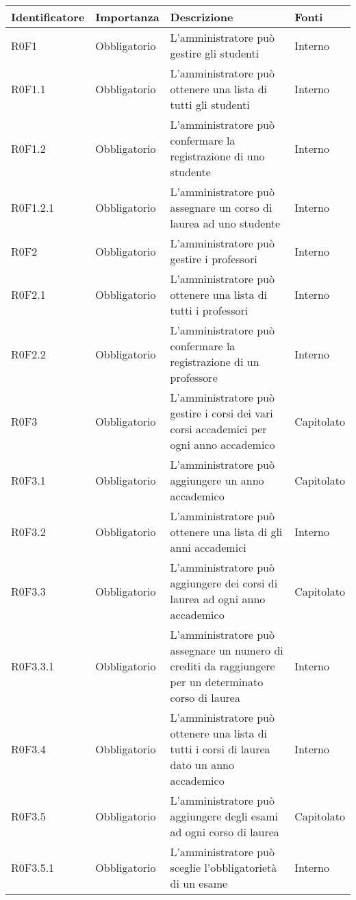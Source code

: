 \documentclass[AnalisiDeiRequisiti.tex]{subfiles}
\begin{document}
\label{table:Tabella requisiti funzionali}
\begin{longtable}[H]{|p{2.5cm}|p{2.5cm}|p{5cm}|p{2cm}|}
	\hline
	\rowcolor[HTML]{38FFF8} 
	\textbf{Identificatore} & \textbf{Importanza} & \textbf{Descrizione} & \textbf{Fonti} \\ \hline
	\endhead
	R0F1 & Obbligatorio & L'amministratore può gestire gli studenti & Interno \\ \hline
	R0F1.1 & Obbligatorio & L'amministratore può ottenere una lista di tutti gli studenti & Interno \\ \hline
	R0F1.2 & Obbligatorio & L'amministratore può confermare la registrazione di uno studente & Interno \\ \hline
	R0F1.2.1 & Obbligatorio & L'amministratore può assegnare un corso di laurea ad uno studente & Interno \\ \hline
	R0F2 & Obbligatorio & L'amministratore può gestire i professori & Interno \\ \hline
	R0F2.1 & Obbligatorio & L'amministratore può ottenere una lista di tutti i professori & Interno \\ \hline
	R0F2.2 & Obbligatorio & L'amministratore può confermare la registrazione di un professore & Interno \\ \hline
	R0F3 & Obbligatorio & L'amministratore può gestire i corsi dei vari corsi accademici per ogni anno accademico & Capitolato \\ \hline %
	R0F3.1 & Obbligatorio & L'amministratore può aggiungere un anno accademico & Capitolato \\ \hline
	R0F3.2 & Obbligatorio & L'amministratore può ottenere una lista di gli anni accademici & Interno \\ \hline
	R0F3.3 & Obbligatorio & L'amministratore può aggiungere dei corsi di laurea ad ogni anno accademico & Capitolato \\ \hline
	R0F3.3.1 & Obbligatorio & L'amministratore può assegnare un numero di crediti da raggiungere per un determinato corso di laurea & Interno \\ \hline
	R0F3.4 & Obbligatorio & L'amministratore può ottenere una lista di tutti i corsi di laurea dato un anno accademico & Interno \\ \hline
	R0F3.5 & Obbligatorio & L'amministratore può aggiungere degli esami ad ogni corso di laurea & Capitolato \\ \hline
	R0F3.5.1 & Obbligatorio & L'amministratore può sceglie l'obbligatorietà di un esame & Interno \\ \hline

\end{longtable}
\end{document}
